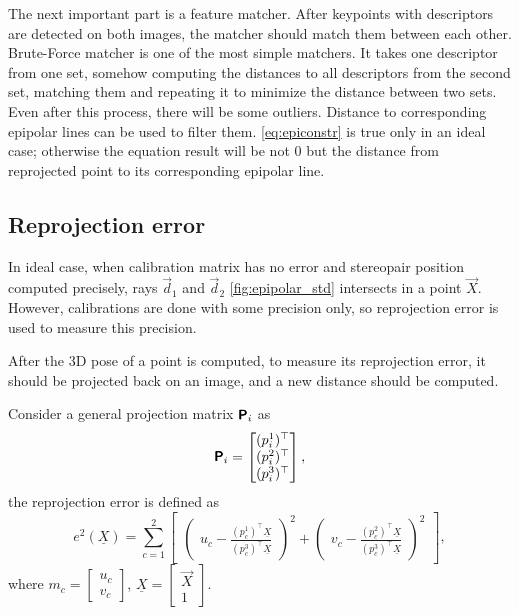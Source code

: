 The next important part is a feature matcher. 
After keypoints with descriptors are detected on both images, the matcher should match them between each other.
Brute-Force matcher is one of the most simple matchers.
It takes one descriptor from one set, somehow computing the distances to all descriptors from the second set, matching them and repeating it to minimize the distance between two sets.
Even after this process, there will be some outliers.
Distance to corresponding epipolar lines can be used to filter them. \autoref{eq:epiconstr} is true only in an ideal case; otherwise the equation result will be not $0$ but the distance from reprojected point to its corresponding epipolar line.

\subsection{Reprojection error}
In ideal case, when calibration matrix has no error and stereopair position computed precisely, rays $\vec{d}_1$ and $\vec{d}_2$ \autoref{fig:epipolar_std} intersects in a point $\vec{X}$. 
However, calibrations are done with some precision only, so reprojection error is used to measure this precision.

After the 3D pose of a point is computed, to measure its reprojection error, it should be projected back on an image, and a new distance should be computed.

Consider a general projection matrix $\pmb{\mathsf{P}}_i$ as
\begin{equation}
    \label{eq:p_general}
    \pmb{\mathsf{P}}_i = \begin{bmatrix} (p_i^1)^\top \\ (p_i^2)^\top \\ (p_i^3)^\top \end{bmatrix},
\end{equation}
the reprojection error is defined as 
\begin{equation}
    e^2(\underline{X}) = \sum_{c=1}^{2}{  
    \begin{bmatrix}
        \begin{pmatrix}
            u_c - \frac{(p_c^1)^\top \underline{X}}{(p_c^3)^\top \underline{X}}
        \end{pmatrix}^2 + 
        \begin{pmatrix}
            v_c - \frac{(p_c^2)^\top \underline{X}}{(p_c^3)^\top \underline{X}}
        \end{pmatrix}^2
    \end{bmatrix}
    },
\end{equation}
where $m_c = \begin{bmatrix} u_c \\ v_c \end{bmatrix}$, $\underline{X} = \begin{bmatrix} \vec{X} \\ 1 \end{bmatrix}$.

